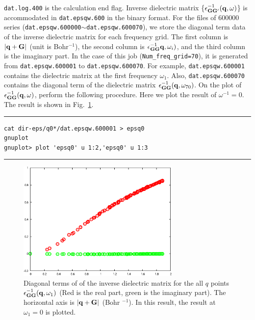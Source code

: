 \documentclass{article}
\begin{document}
\verb+dat.log.400+ is the calculation end flag. Inverse dielectric matrix \{$\epsilon_{{\bf GG'}}^{-1}({\bf q},\omega)$\} is accommodated in \verb+dat.epsqw.600+ in the binary format. For the files of 600000 series ({\tt dat.epsqw.600000}$\sim${\tt dat.epsqw.600070}), we store the diagonal term data of the inverse dielectric matrix for each frequency grid. The first column is $|{\bf q+G}|$ (unit is Bohr$^{- 1}$), the second column is $\epsilon_{{\bf GG}}^{-1}{\bf q}, \omega_i)$, and the third column is the imaginary part. In the case of this job (\verb+Num_freq_grid=70+), it is generated from \verb+dat.epsqw.600001+ to \verb+dat.epsqw.600070+. For example, {\tt dat.epsqw.600001}  contains the dielectric matrix at the first frequency $\omega_1$. Also, {\tt dat.epsqw.600070} contains the diagonal term of the dielectric matrix $\epsilon_{{\bf GG}}^{-1}({\bf q}, \omega_{70})$. On the plot of $\epsilon_{{\bf GG}}^{-1}({\bf q},\omega)$, perform the following procedure. Here we plot the result of $\omega^{-1}=0$. The result is shown in Fig.~\ref{epsqw}.   
\vspace{3mm}\hrule
\begin{verbatim}
cat dir-eps/q0*/dat.epsqw.600001 > epsq0
gnuplot
gnuplot> plot 'epsq0' u 1:2,'epsq0' u 1:3  
\end{verbatim}
\hrule\vspace{3mm}
\begin{figure}[H] 
\centering
\includegraphics[width=8cm]{epsq0-Al.eps}
\caption{Diagonal terms of of the inverse dielectric matrix for the all $q$ points $\epsilon_{{\bf GG}}^{-1}({\bf q}, \omega_1)$ (Red is the real part, green is the imaginary part). The horizontal axis is $|{\bf q+G}|$ (Bohr $^{-1}$). In this result, the result at $\omega_1=0$ is plotted.}
\label{epsqw}
\end{figure}
\end{document}
